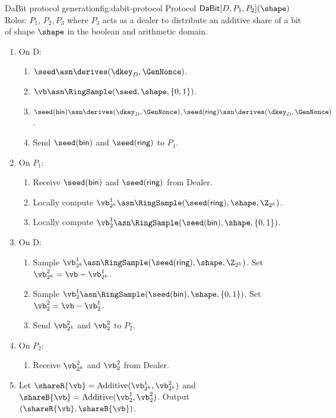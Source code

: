 \begin{Boxfig}{DaBit protocol generation}{fig:dabit-protocol}
  {Protocol $\mathsf{DaBit}[D, P_1, P_2](\shape)$}
  Roles: $P_1$, $P_2, P_3$ where $P_3$ acts as a dealer to distribute
  an additive share of a bit of shape $\shape$ in the boolean and arithmetic domain.
  \begin{enumerate}
  \item On D:
  \begin{enumerate}
    \item $\seed \asn \derives(\dkey_D, \GenNonce)$.
    \item $\vb \asn \RingSample(\seed, \shape, \{0, 1\})$.
    \item $\seed(\textsf{bin}) \asn \derives(\dkey_D, \GenNonce), \seed(\textsf{ring}) \asn \derives(\dkey_D, \GenNonce)$.
    \item Send $\seed(\textsf{bin})$ and $\seed(\textsf{ring})$ to $P_1$.

  \end{enumerate}
  \item On $P_1$:
 \begin{enumerate}
     \item Receive $\seed(\textsf{bin})$ and $\seed(\textsf{ring})$ from Dealer.
     \item Locally compute $\vb^1_{2^k} \asn \RingSample(\seed(\textsf{ring}), \shape, \Z_{2^k})$.
     \item Locally compute $\vb^1_{2} \asn \RingSample(\seed(\textsf{bin}), \shape, \{0, 1\})$.
 \end{enumerate}
\item On D:
\begin{enumerate}
    \item Sample $\vb^1_{2^k} \asn \RingSample(\seed(\textsf{ring}), \shape, \Z_{2^k})$. Set $\vb^2_{2^k} = \vb - \vb^1_{2^k}$.
    \item Sample $\vb^1_{2} \asn \RingSample(\seed(\textsf{bin}), \shape, \{0, 1\})$. Set $\vb^2_{2} = \vb - \vb^1_{2}$. 
    \item Send $\vb^2_{2^k}$ and $\vb^2_2$ to $P_2$.
\end{enumerate}
\item On $P_2$:
\begin{enumerate}
    \item Receive $\vb^2_{2^k}$ and $\vb^2_2$ from Dealer.
\end{enumerate}
\item Let $\shareR{\vb} = \text{Additive}(\vb^1_{2^k}, \vb^2_{2^k})$ and $\shareB{\vb} = \text{Additive}(\vb^1_2, \vb^2_2)$. Output $(\shareR{\vb}, \shareB{\vb})$.
\end{enumerate}
\end{Boxfig}

